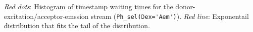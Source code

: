 \textit{Red dots}: Histogram of timestamp waiting times for the donor-excitation/acceptor-emssion stream (\verb|Ph_sel(Dex='Aem')|). \textit{Red line}: Exponentail distribution that fits the tail of the distribution.